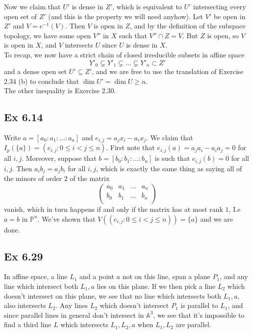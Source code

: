 \documentclass{article}
\theoremstyle{definition}
\renewcommand{\P}{\mathbb{P}}
\newcommand{\A}{\mathbb{A}}
\renewcommand{\AA}[1]{\A^{#1}}
\newcommand{\Pn}{\P^n}
\begin{document}
Now we claim that $U'$ is dense in $Z'$, which is equivalent to $U'$
intersecting every open set of $Z'$ (and this is the property we will need
anyhow). Let $V'$ be open in $Z'$ and $V = e^{-1}(V)$. Then $V$ is open in $Z$,
and by the definition of the subspace topology, we have some open $V''$ in $X$
such that $V'' \cap Z = V$. But $Z$ is open, so $V$ is open in $X$, and $V$
intersects $U$ since $U$ is dense in $X$. \\

To recap, we now have a strict chain of closed irreducible subsets 
in affine space 
\[
	Y'_0 \subsetneq Y'_1 \subsetneq \ldots \subsetneq Y'_n \subset Z'
\] 
and a dense open set $U' \subseteq Z'$, and we are free to use the translation
of Exercise 2.34 (b) to conclude that $\dim U' = \dim U \geq n$. \\

The other inequality is Exercise 2.30.

\subsection*{Ex 6.14}

Write $a = [a_0 : a_1 : \ldots : a_n]$ and $e_{i, j} = a_j x_i - a_i x_j$. We
claim that $I_p(\{a\}) = (e_{i, j} : 0 \leq i < j \leq n)$. First note that
$e_{i, j}(a) = a_j a_i - a_i a_j = 0$ for all $i, j$. Moreover, suppose that $b
= [b_0 : b_1 : \ldots : b_n]$ is such that $e_{i,j}(b) = 0$ for all $i, j$.
Then $a_i b_j = a_j b_i$ for all $i, j$, which is exactly the same thing as
saying all of the minors of order $2$ of the matrix 
\[
\begin{pmatrix}
	a_0 & a_1 & \ldots & a_n \\	
	b_0 & b_1 & \ldots & b_n \\	
\end{pmatrix}
\] 
vanish, which in turn happens if and only if the matrix has at
most rank $1$, I.e $a = b$ in $\Pn$. We've shown that $V((e_{i, j} : 0 \leq i <
j \leq n)) = \{a\}$ and we are done.

\subsection*{Ex 6.29}

In affine space, a line $L_1$ and a point $a$ not on this line, span a plane $P_1$,
and any line which intersect both $L_1, a$ lies on this plane. If we then pick
a line $L_2$ which doesn't intersect on this plane, we see that no line which
intersects both $L_1, a$, also intersects $L_2$. Any lines $L_2$ which doesn't
intersect $P_1$ is parallel to $L_1$, and since
parallel lines in general don't intersect in $\AA{3}$, we see that it's
impossible to find a third line $L$ which intersects $L_1, L_2, a$ 
when $L_1, L_2$ are parallel. \\
\end{document}

